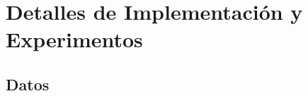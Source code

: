 \chapter{Detalles de Implementación y Experimentos}\label{chapter:implementation}

\section*{Datos}

